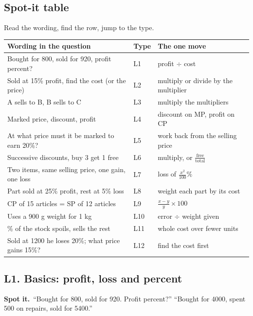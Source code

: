 \documentclass[11pt,a4paper]{article}
\let\oldsubsection\subsection
\renewcommand{\subsection}{\needspace{9\baselineskip}\oldsubsection}
\newcommand{\spot}{\textbf{\color{ember}Spot it.}\ }
\begin{document}
\subsection*{Spot-it table}
Read the wording, find the row, jump to the type.
\begin{center}\small\renewcommand{\arraystretch}{1.18}\setlength{\tabcolsep}{7pt}
\begin{tabularx}{\linewidth}{@{}>{\raggedright\arraybackslash}X l >{\raggedright\arraybackslash}X@{}}
\toprule
\textbf{\color{slate}Wording in the question} & \textbf{\color{slate}Type} & \textbf{\color{slate}The one move} \\ \midrule
Bought for 800, sold for 920, profit percent? & L1 & profit $\div$ cost \\
Sold at 15\% profit, find the cost (or the price) & L2 & multiply or divide by the multiplier \\
A sells to B, B sells to C & L3 & multiply the multipliers \\
Marked price, discount, profit & L4 & discount on MP, profit on CP \\
At what price must it be marked to earn 20\%? & L5 & work back from the selling price \\
Successive discounts, buy 3 get 1 free & L6 & multiply, or $\frac{\text{free}}{\text{total}}$ \\
Two items, same selling price, one gain, one loss & L7 & loss of $\frac{x^2}{100}\%$ \\
Part sold at 25\% profit, rest at 5\% loss & L8 & weight each part by its cost \\
CP of 15 articles = SP of 12 articles & L9 & $\frac{x-y}{y}\times 100$ \\
Uses a 900 g weight for 1 kg & L10 & error $\div$ weight given \\
20\% of the stock spoils, sells the rest & L11 & whole cost over fewer units \\
Sold at 1200 he loses 20\%; what price gains 15\%? & L12 & find the cost first \\
\bottomrule
\end{tabularx}\end{center}

\subsection{L1. Basics: profit, loss and percent}
\spot ``Bought for 800, sold for 920. Profit percent?'' ``Bought for 4000, spent 500 on repairs, sold for 5400.''
\end{document}

